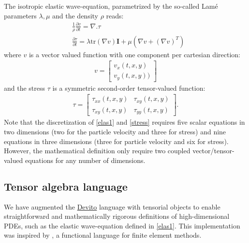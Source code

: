 \documentclass[10pt, conference]{IEEEtran}
\newcommand{\devito}{\href{https://github.com/devitocodes/devito}{Devito} }
\begin{document}
The isotropic elastic wave-equation, parametrized by the so-called Lamé parameters
$\lambda, \mu$ and the density $\rho$ reads:
%
\begin{equation}
\begin{aligned}
&\frac{1}{\rho}\frac{\partial v}{\partial t} = \nabla . \tau \\
&\frac{\partial \tau}{\partial t} = \lambda \mathrm{tr}(\nabla v) \mathbf{I}  + \mu (\nabla v + (\nabla v)^T)
\end{aligned}
\label{elas1}
\end{equation}
%
\noindent
 where $v$ is a vector valued function with one component per cartesian
direction:
%
\begin{equation}
\begin{split}
v =  \begin{bmatrix} v_x(t, x, y) \\ v_y(t, x, y)) \end{bmatrix}
\end{split}
\label{partvel}
\end{equation}
%
 and the stress $\tau$ is a symmetric second-order tensor-valued
function:
%
\begin{equation}
\begin{aligned}
    \tau = \begin{bmatrix}\tau_{xx}(t, x, y) & \tau_{xy}(t, x, y)\\\tau_{xy}(t, x, y) & \tau_{yy}(t, x, y)\end{bmatrix}.
\end{aligned}
\label{stress}
\end{equation}
%
 Note that the discretization of \eqref{elas1} and \eqref{stress} requires five
scalar equations in two dimensions (two for the particle velocity and
three for stress) and nine equations in three dimensions (three for particle velocity
and six for stress). However, the mathematical
definition only require two coupled vector/tensor-valued equations for
any number of dimensions.

\subsection{Tensor algebra language}\label{tensor-algebra-language}

We have augmented the \devito language with tensorial objects to enable
straightforward and mathematically rigorous definitions of
high-dimensional PDEs, such as the elastic wave-equation defined in
\eqref{elas1}. This implementation was inspired by \cite{ufl}, a
functional language for finite element methods.
\end{document}
